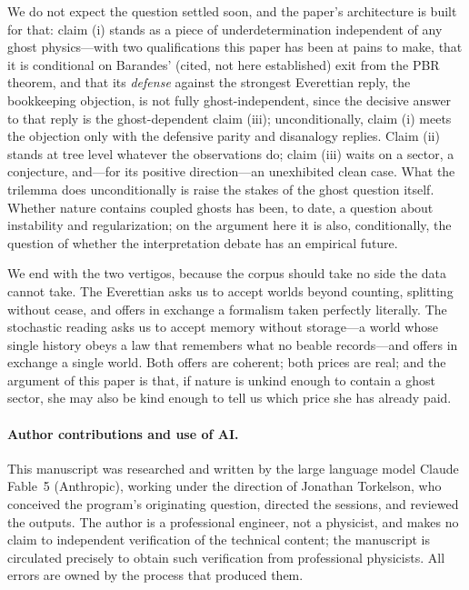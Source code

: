 \documentclass[11pt]{article}
\theoremstyle{remark}
\begin{document}
We do not expect the question settled soon, and the paper's
architecture is built for that: claim (i) stands as a piece of
underdetermination independent of any ghost physics---with two
qualifications this paper has been at pains to make, that it is
conditional on Barandes' (cited, not here established) exit from the
PBR theorem, and that its \emph{defense} against the strongest
Everettian reply, the bookkeeping objection, is not fully
ghost-independent, since the decisive answer to that reply is the
ghost-dependent claim (iii); unconditionally, claim (i) meets the
objection only with the defensive parity and disanalogy replies.
Claim (ii) stands at tree level whatever the observations do; claim
(iii) waits on a sector, a conjecture, and---for its positive
direction---an unexhibited clean case. What the trilemma does
unconditionally is raise the stakes of the ghost question itself. Whether nature contains coupled ghosts has been, to
date, a question about instability and regularization; on the
argument here it is also, conditionally, the question of whether the
interpretation debate has an empirical future.

We end with the two vertigos, because the corpus should take no side
the data cannot take. The Everettian asks us to accept worlds beyond
counting, splitting without cease, and offers in exchange a formalism
taken perfectly literally. The stochastic reading asks us to accept
memory without storage---a world whose single history obeys a law
that remembers what no beable records---and offers in exchange a
single world. Both offers are coherent; both prices are real; and
the argument of this paper is that, if nature is unkind enough to
contain a ghost sector, she may also be kind enough to tell us which
price she has already paid.

\paragraph{Author contributions and use of AI.} This manuscript was
researched and written by the large language model Claude Fable~5
(Anthropic), working under the direction of Jonathan Torkelson, who
conceived the program's originating question, directed the sessions,
and reviewed the outputs. The author is a professional engineer, not
a physicist, and makes no claim to independent verification of the
technical content; the manuscript is circulated precisely to obtain
such verification from professional physicists. All errors are owned
by the process that produced them.
\end{document}
